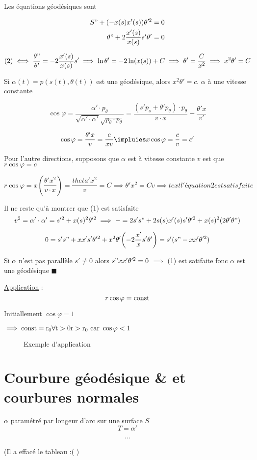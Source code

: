 Les équations géodésiques sont 

\begin{align}
	S" + (-x(s) x'(s))\theta'^2 = 0\\
	\theta" + 2 \frac{x'(s)}{x(s)} s'\theta' =0
\end{align}


$$(2) \iff \frac{\theta"}{\theta'} = -2 \frac{x'(s)}{x(s)} s' \implies \ln\theta' = -2\ln(x(s)) + C \implies \theta' = \frac{C}{x^2} \implies x^2 \theta' = C  $$ 

Si $\alpha(t) = p(s(t),\theta(t))$ est une géodésique, alors $x^2 \theta' = c$. $\alpha$ à une vitesse constante 

$$\cos\varphi = \frac{\alpha' \cdot p_{\theta} }{\sqrt{\alpha'\cdot \alpha'}\sqrt{p_{\theta}\cdot p_{\theta} }} = \frac{(s'p_{s} + \theta' p_{\theta}) \cdot p_\theta}{v\cdot x} - \frac{\theta'x}{v'} $$ 

$$\cos\varphi = \frac{\theta'x}{v} = \frac{c}{xv} \impluies x\cos\varphi = \frac{c}{v} = c'$$ 

Pour l'autre directions, supposons que $\alpha$ est à vitesse constante $v$ est que $r\cos\varphi = c$   

$$r\cos\varphi = x \left( \frac{\theta'x^2}{v\cdot x}  \right)  = \frac{theta'x^2}{v} = C \implies \theta'x^2 = Cv \implies text{l'équation 2 est satisfaite} $$ 

Il ne reste qu'à montrer que (1) est satisfaite $$v^2 = \alpha'\cdot \alpha' = s'^2 + x(s)^2\theta'^2 \implies - = 2s's"+ 2s(s)x'(s)s'\theta'^2 + x(s)^2(2\theta'\theta")$$ 

$$0 = s's" + x x' s' \theta'^2 + x^2 \theta'\qty(-2 \frac{x'}{x} s'\theta') = s'(s" - x x'\theta'^2)$$ 

Si $\alpha$ n'est pas parallèle $s'\neq 0$ alors $s" x x'\theta'^2 = 0 $ $\implies$ (1) est satifaite fonc $\alpha$ est une géodésique $\blacksquare$     

\underline{Application} : $$r\cos\varphi = \rm{const}$$  

Initiallement $\cos\varphi =1$ 

$\implies \rm{const} =r_{0} \forall t>0 r>r_{0} \text{ car }\cos\varphi <1$ 

\begin{figure}[ht]
    \centering
    \caption{Exemple d'application}
    \label{fig:exemple-d'application}
\end{figure}

\section*{Courbure géodésique \& et courbures normales}


$\alpha$ paramétré par longeur d'arc sur une surface $S$ $$ T = \alpha'$$

$$\dotsb$$

(Il a effacé le tableau :( )
	

